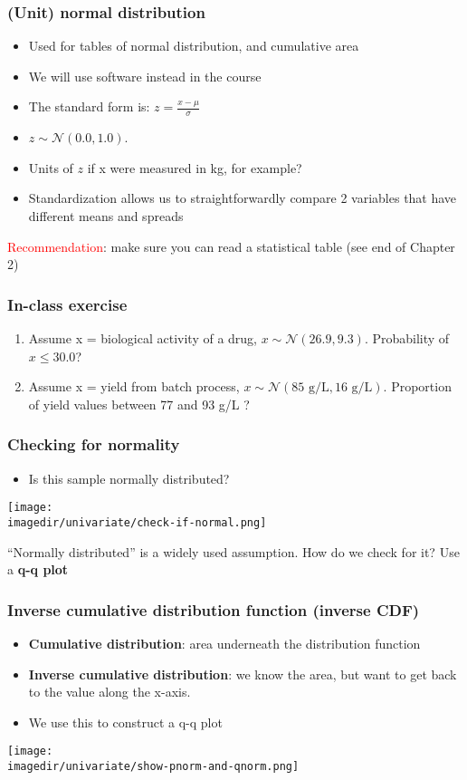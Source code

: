 \begin{frame}\frametitle{(Unit) normal distribution}
	\begin{itemize}
		\item Used for tables of normal distribution, and cumulative area
		\item We will use software instead in the course \pause
		\item The standard form is: $ z = \displaystyle \frac{x - \mu}{\sigma} $
		\item $z \sim \mathcal{N}(0.0, 1.0)$.
		\item Units of $z$ if x were measured in kg, for example? \pause
		\item Standardization allows us to straightforwardly compare 2 variables that have different means and spreads
	\end{itemize}

	\textcolor{red}{Recommendation}: make sure you can read a statistical table (see end of Chapter 2)
\end{frame}

\begin{frame}\frametitle{In-class exercise}
	\begin{enumerate}
		\item Assume x = biological activity of a drug, $x \sim \mathcal{N}(26.9, 9.3)$. Probability of $x \leq 30.0$?
		\item Assume x = yield from batch process, $x \sim \mathcal{N}(85 \text{~g/L}, 16 \text{~g/L})$. Proportion of yield values between 77 and 93 g/L ?
	\end{enumerate}
\end{frame}

\begin{frame}\frametitle{Checking for normality}
	\begin{itemize}
		\item Is this sample normally distributed?
	\end{itemize}
	\begin{center}
		\texttt{[image: \\imagedir/univariate/check-if-normal.png]}
	\end{center}
	``Normally distributed'' is a widely used assumption. How do we check for it? Use a \textbf{q-q plot}
\end{frame}

\begin{frame}\frametitle{Inverse cumulative distribution function (inverse CDF)}
	\begin{itemize}
		\item \textbf{Cumulative distribution}: area underneath the distribution function
		\item \textbf{Inverse cumulative distribution}: we know the area, but want to get back to the value along the x-axis.
		\item We use this to construct a q-q plot
	\end{itemize}

	\begin{center}
		\texttt{[image: \\imagedir/univariate/show-pnorm-and-qnorm.png]}
	\end{center}
\end{frame}

